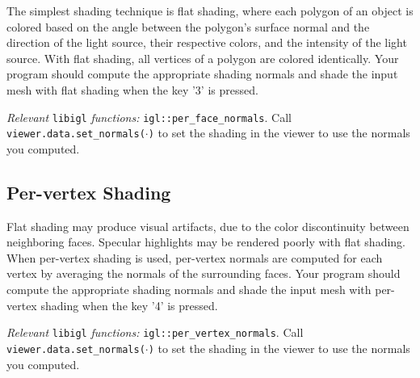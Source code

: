 \documentclass[11pt]{amsart}
\begin{document}
The simplest shading technique is flat shading, where each polygon of an object
is colored based on the angle between the polygon's surface normal and the
direction of the light source, their respective colors, and the intensity of the
light source. With flat shading, all vertices of a polygon are colored
identically. Your program should compute the appropriate shading normals and shade
the input mesh with flat shading when the key '3' is pressed.

\emph{Relevant} \texttt{libigl} \emph{functions: }
\texttt{igl::per\_face\_normals}. Call \texttt{viewer.data.set\_normals($\cdot$)} to
set the shading in the viewer to use the normals you computed.

\subsection{Per-vertex Shading}
Flat shading may produce visual artifacts, due to the color discontinuity
between neighboring faces. Specular highlights may be rendered poorly with flat
shading. When per-vertex shading is used, per-vertex normals are computed for
each vertex by averaging the normals of the surrounding faces. Your program
should compute the appropriate shading normals and shade the input mesh with
per-vertex shading when the key '4' is pressed.

\emph{Relevant} \texttt{libigl} \emph{functions: }
\texttt{igl::per\_vertex\_normals}. Call \texttt{viewer.data.set\_normals($\cdot$)} to
set the shading in the viewer to use the normals you computed.
\end{document}
